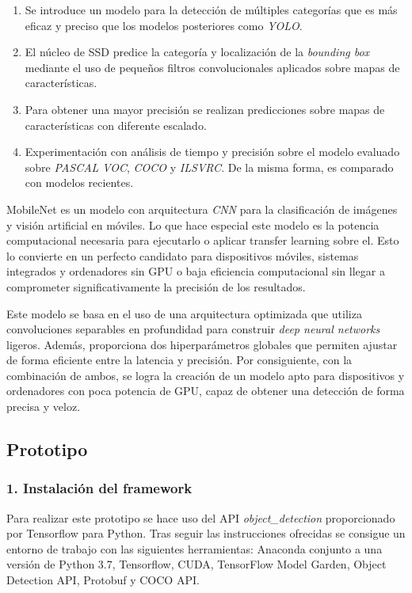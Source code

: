 \begin{enumerate}
	\item Se introduce un modelo para la detección de múltiples categorías que es más eficaz y preciso que los modelos posteriores como \textit{YOLO}.
	\item El núcleo de SSD predice la categoría y localización de la \textit{bounding box} mediante el uso de pequeños filtros convolucionales aplicados sobre mapas de características.
	\item Para obtener una mayor precisión se realizan predicciones sobre mapas de características con diferente escalado.
	\item Experimentación con análisis de tiempo y precisión sobre el modelo evaluado sobre \textit{PASCAL VOC}, \textit{COCO} y \textit{ILSVRC}. De la misma forma, es comparado con modelos recientes.
\end{enumerate}

MobileNet es un modelo con arquitectura \textit{CNN} para la clasificación de imágenes y visión artificial en móviles. Lo que hace especial este modelo es la potencia computacional necesaria para ejecutarlo o aplicar transfer learning sobre el. Esto lo convierte en un perfecto candidato para dispositivos móviles, sistemas integrados y ordenadores sin GPU o baja eficiencia computacional sin llegar a comprometer significativamente la precisión de los resultados.

Este modelo se basa en el uso de una arquitectura optimizada que utiliza convoluciones separables en profundidad para construir \textit{deep neural networks} ligeros. Además, proporciona dos hiperparámetros globales que permiten ajustar de forma eficiente entre la latencia y precisión. Por consiguiente, con la combinación de ambos, se logra la creación de un modelo apto para dispositivos y ordenadores con poca potencia de GPU, capaz de obtener una detección de forma precisa y veloz.

\newpage
\subsection*{Prototipo}

\vspace{-0.5cm}
\subsubsection*{1. Instalación del framework}
\vspace{-0.7cm}
Para realizar este prototipo se hace uso del API \textit{object\_detection} proporcionado por Tensorflow para Python. Tras seguir las instrucciones ofrecidas se consigue un entorno de trabajo con las siguientes herramientas: Anaconda conjunto a una versión de Python 3.7, Tensorflow, CUDA, TensorFlow Model Garden,  Object Detection API, Protobuf y COCO API.

